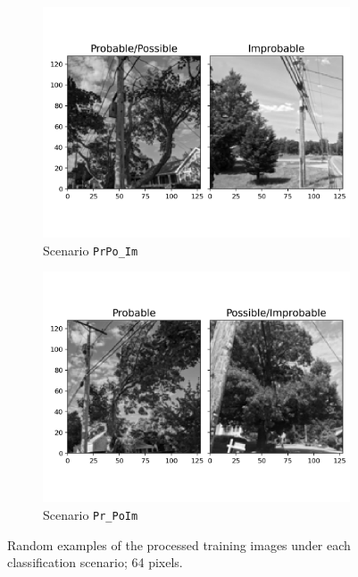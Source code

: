 \documentclass[Journal,letterpaper, SingleSpace, InsideFigs]{ascelike-new}
\begin{document}
\begin{figure}[h!]
  \begin{subfigure}[t]{.5\linewidth}
    \centering
    \includegraphics[width=\linewidth]{processed_input_images_PrPo_Im_128_px}
    \caption{Scenario \texttt{PrPo\_Im}}
    \label{prpo_im_64}
  \end{subfigure}%
  \begin{subfigure}[t]{.5\linewidth}
    \centering
    \includegraphics[width=\linewidth]{processed_input_images_Pr_PoIm_128_px}
    \caption{Scenario \texttt{Pr\_PoIm}}
    \label{pr_poim_64}
  \end{subfigure}%

  \caption{Random examples of the processed training images under each classification scenario; 64 pixels.}
  \label{fig:processed_images}
\end{figure}
\end{document}

